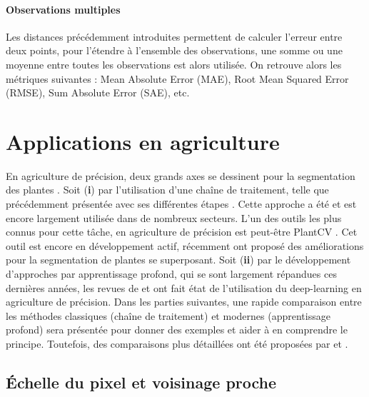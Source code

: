 \documentclass[../thesis.tex]{subfiles}
\begin{document}
    \paragraph{Observations multiples} Les distances précédemment introduites permettent de calculer l'erreur entre deux points, pour l'étendre à l'ensemble des observations, une somme ou une moyenne entre toutes les observations est alors utilisée. On retrouve alors les métriques suivantes : Mean Absolute Error (MAE), Root Mean Squared Error (RMSE), Sum Absolute Error (SAE), etc.
    
    \newpage
    
    
    \section{Applications en agriculture}
    
    En agriculture de précision, deux grands axes se dessinent pour la segmentation des plantes \cite{hu2021deep}. Soit (\textbf{i}) par l'utilisation d'une chaîne de traitement, telle que précédemment présentée avec ses différentes étapes \cite{pmid29048559, WANG2019154}. Cette approche a été et est encore largement utilisée dans de nombreux secteurs. L'un des outils les plus connus pour cette tâche, en agriculture de précision est peut-être PlantCV \cite{fahlgren2015versatile, gehan2017plantcv}. Cet outil est encore en développement actif, récemment \cite{Ortega2021} ont proposé des améliorations pour la segmentation de plantes se superposant. Soit (\textbf{ii}) par le développement d'approches par apprentissage profond, qui se sont largement répandues ces dernières années, les revues de \cite{kamilaris2018deep, hu2021deep, Hasan2021, OSCO2021102456} et \cite{rs14030559} ont fait état de l'utilisation du deep-learning en agriculture de précision. Dans les parties suivantes, une rapide comparaison entre les méthodes classiques (chaîne de traitement) et modernes (apprentissage profond) sera présentée pour donner des exemples et aider à en comprendre le principe. Toutefois, des comparaisons plus détaillées ont été proposées par \cite{s21113647} et \cite{Salisu2021}.
    
    \subsection{Échelle du pixel et voisinage proche}
    
\end{document}
